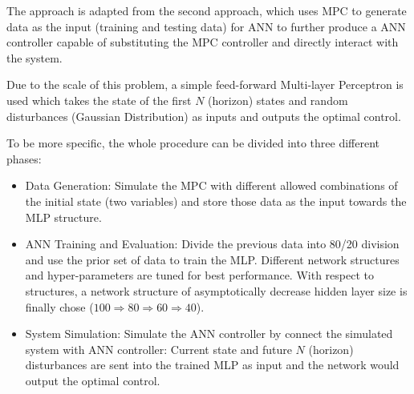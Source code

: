 \documentclass[conference]{IEEEtran}
\begin{document}
The approach is adapted from the second approach, which uses MPC to generate data as the input (training and testing data) for ANN to further produce a ANN controller capable of substituting the MPC controller and directly interact with the system.

Due to the scale of this problem, a simple feed-forward Multi-layer Perceptron is used which takes the state of the first $N$ (horizon) states and random disturbances (Gaussian Distribution) as inputs and outputs the optimal control.

To be more specific, the whole procedure can be divided into three different phases:
\begin{itemize}
\item Data Generation: Simulate the MPC with different allowed combinations of the initial state (two variables) and store those data as the input towards the MLP structure.
\item ANN Training and Evaluation: Divide the previous data into 80/20 division and use the prior set of data to train the MLP. Different network structures and hyper-parameters are tuned for best performance. With respect to structures, a network structure of asymptotically decrease hidden layer size is finally chose ($100\Longrightarrow80\Longrightarrow60\Longrightarrow40$).\\
\item System Simulation: Simulate the ANN controller by connect the simulated system with ANN controller: Current state and future $N$ (horizon) disturbances are sent into the trained MLP as input and the network would output the optimal control.
\end{itemize}
\end{document}
